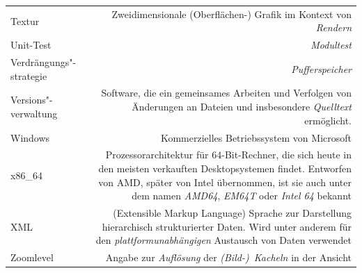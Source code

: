 \documentclass[10pt]{scrreprt}
\newcommand{\textref}[1]{\mbox{\raisebox{0.1ex}{\small$\rightarrow$ }\textit{#1}}}
\begin{document}
\begin{longtabu}{L{0.35} R{1.65}}
Textur & Zweidimensionale (Oberflächen-) Grafik im Kontext von \textref{Rendern}\\
Unit-Test & \textref{Modultest}\\
Verdrängungs"-strategie & \textref{Pufferspeicher}\\
Versions"-verwaltung & Software, die ein gemeinsames Arbeiten und Verfolgen von Änderungen an Dateien und insbesondere \textref{Quelltext} ermöglicht.\\
Windows & Kommerzielles Betriebssystem von Microsoft\\
x86\_64 & Prozessorarchitektur für 64-Bit-Rechner, die sich heute in den meisten verkauften Desktopsystemen findet. Entworfen von AMD, später von Intel übernommen, ist sie auch unter dem namen \textit{AMD64}, \textit{EM64T} oder \textit{Intel 64} bekannt\\
XML & (Extensible Markup Language) Sprache zur Darstellung hierarchisch strukturierter Daten. Wird unter anderem für den \textref{plattformunabhängigen} Austausch von Daten verwendet\\
Zoomlevel & Angabe zur \textref{Auflösung} der \textref{(Bild-) Kacheln} in der Ansicht\\
\end{longtabu}
\end{document}
